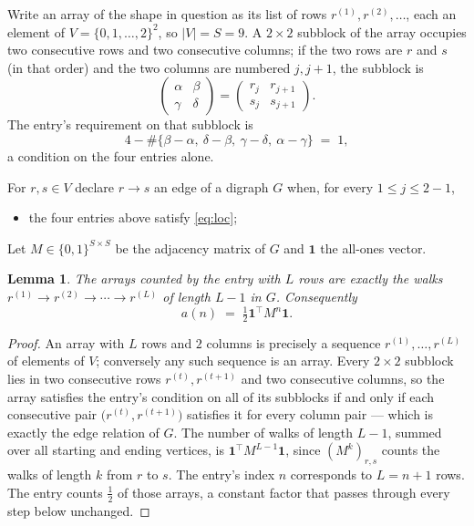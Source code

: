 \documentclass[11pt,a4paper]{article}
\theoremstyle{plain}
\newtheorem{lemma}[theorem]{Lemma}
\theoremstyle{definition}
\begin{document}
Write an array of the shape in question as its list of rows
$r^{(1)},r^{(2)},\dots$, each an element of
$V=\{0,1,\dots,2\}^{2}$, so $|V|=S=9$. A $2\times2$ subblock of the array
occupies two consecutive rows and two consecutive columns; if the two rows are $r$
and $s$ (in that order) and the two columns are numbered $j,j+1$,
the subblock is
\[
\begin{pmatrix}\alpha&\beta\\\gamma&\delta\end{pmatrix}=\begin{pmatrix}r_j&r_{j+1}\\s_j&s_{j+1}\end{pmatrix}.
\]
The entry's requirement on that subblock is
\begin{equation}\label{eq:loc}
4-\#\{\beta-\alpha,\ \delta-\beta,\ \gamma-\delta,\ \alpha-\gamma\}\;=\;1,
\end{equation}
a condition on the four entries alone.

For $r,s\in V$ declare $r\to s$ an edge of a digraph $G$ when, for every
$1\le j\le 2-1$,
\begin{itemize}
\item the four entries above satisfy \eqref{eq:loc};

\end{itemize}
Let $M\in\{0,1\}^{S\times S}$ be the adjacency matrix of $G$ and $\mathbf{1}$ the
all-ones vector.

\begin{lemma}\label{lem:walk}
The arrays counted by the entry with $L$ rows are exactly the walks
$r^{(1)}\to r^{(2)}\to\cdots\to r^{(L)}$ of length $L-1$ in $G$. Consequently
\[
a(n)\;=\;\tfrac1{2}\mathbf{1}^{\!\top}M^{n}\mathbf{1} .
\]
\end{lemma}

\begin{proof}
An array with $L$ rows and $2$ columns is precisely a sequence
$r^{(1)},\dots,r^{(L)}$ of elements of $V$; conversely any such sequence is an array.
Every $2\times2$ subblock lies in two consecutive rows $r^{(t)},r^{(t+1)}$ and two
consecutive columns, so the array satisfies the entry's condition on all of its subblocks
if and only if each consecutive pair $\bigl(r^{(t)},r^{(t+1)}\bigr)$ satisfies it for
every column pair --- which is exactly the edge relation of $G$. The number of walks of
length $L-1$, summed over all starting and ending vertices, is
$\mathbf{1}^{\!\top}M^{L-1}\mathbf{1}$, since $(M^{k})_{r,s}$ counts the walks of
length $k$ from $r$ to $s$. The entry's index $n$ corresponds to $L=n+1$ rows. The entry counts $\tfrac1{2}$ of those arrays, a constant factor that passes through every step below unchanged.
\end{proof}
\end{document}
